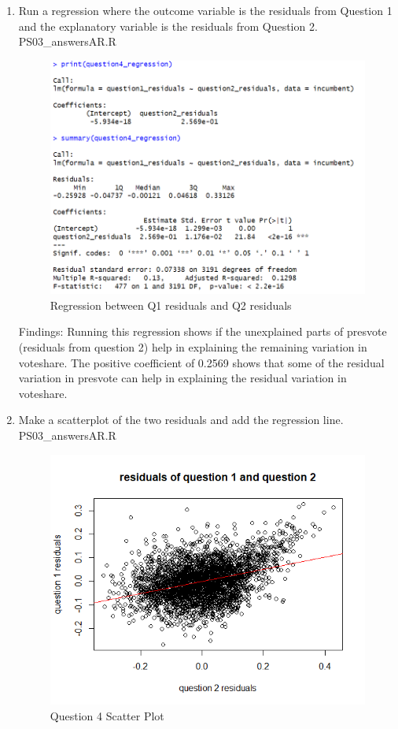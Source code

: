 \documentclass[12pt,letterpaper]{article}
\begin{document}
	\begin{enumerate}
		\item Run a regression where the outcome variable is the residuals from Question 1 and the explanatory variable is the residuals from Question 2.	
		 {PS03_answersAR.R}
		\begin{figure}[h!]\centering
			\caption{\footnotesize Regression between Q1 residuals and Q2 residuals}
			\label{}
			\includegraphics[width=.85\textwidth]{question4_regression.png}
		\end{figure}
			Findings: Running this regression shows if the unexplained parts of presvote (residuals from question 2) help in explaining the remaining variation in voteshare. The positive coefficient of 0.2569 shows that some of the residual variation in presvote can help in explaining the residual variation in voteshare.
		\item Make a scatterplot of the two residuals and add the regression line. 	
		 {PS03_answersAR.R}
		\begin{figure}[h!]\centering
			\caption{\footnotesize Question 4 Scatter Plot}
			\label{}
			\includegraphics[width=.85\textwidth]{question4_scatter.png} 

\end{figure}
\end{enumerate}
\end{document}
